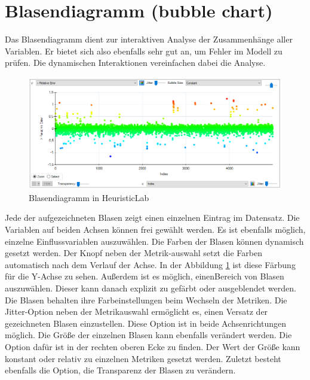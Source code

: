 \pagebreak

\section{Blasendiagramm (bubble chart)}
\label{sec:bubble-chart}

Das Blasendiagramm dient zur interaktiven Analyse der Zusammenhänge aller Variablen.
Er bietet sich also ebenfalls sehr gut an, um Fehler im Modell zu prüfen. Die dynamischen Interaktionen vereinfachen dabei die Analyse.

\begin{figure}[H]
    \centering
    \includegraphics[height=.5\textwidth]{images/bubble-chart.png}
    \caption{Blasendiagramm in HeuristicLab}
    \label{fig:example_bubble_chart}
\end{figure}

\noindent Jede der aufgezeichneten Blasen zeigt einen einzelnen Eintrag im Datensatz. Die Variablen auf beiden Achsen können frei gewählt werden. 
Es ist ebenfalls möglich, einzelne Einflussvariablen auszuwählen.\newline\newline
Die Farben der Blasen können dynamisch gesetzt werden. Der Knopf neben der Metrik-auswahl setzt die Farben automatisch nach dem
Verlauf der Achse. In der Abbildung \ref{fig:example_bubble_chart} ist diese Färbung für die Y-Achse zu sehen. Außerdem ist es möglich, einen\linebreak Bereich von Blasen auszuwählen. Dieser kann danach explizit zu gefärbt oder ausgeblendet werden. Die Blasen behalten ihre Farbeinstellungen beim Wechseln der Metriken.\newline\newline
Die Jitter-Option neben der Metrikauswahl ermöglicht es, einen Versatz der gezeichneten Blasen einzustellen. Diese Option ist in beide Achsenrichtungen möglich.
Die Größe der einzelnen Blasen kann ebenfalls verändert werden. Die Option dafür ist in der rechten oberen Ecke zu finden. Der Wert der Größe kann konstant oder relativ zu einzelnen Metriken gesetzt werden. Zuletzt besteht ebenfalls die Option, die Transparenz der Blasen zu verändern.

